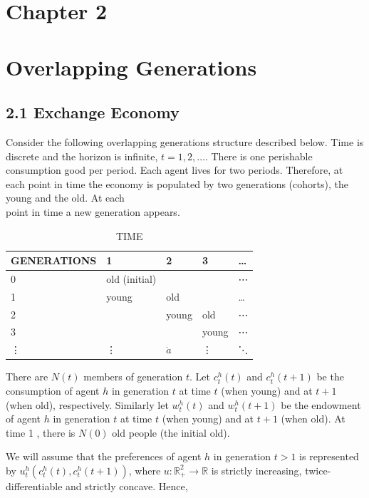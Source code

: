 \documentclass[10pt]{article}
\begin{document}
\captionsetup{singlelinecheck=false}
\section*{Chapter 2}
\section*{Overlapping Generations}
\subsection*{2.1 Exchange Economy}
Consider the following overlapping generations structure described below. Time is discrete and the horizon is infinite, $t=1,2, \ldots$. There is one perishable consumption good per period. Each agent lives for two periods. Therefore, at each point in time the economy is populated by two generations (cohorts), the young and the old. At each\\
point in time a new generation appears.

\begin{table}[h]
\begin{center}
\captionsetup{labelformat=empty}
\caption{TIME}
\begin{tabular}{|l|l|l|l|l|}
\hline
GENERATIONS & 1 & 2 & 3 & … \\
\hline
0 & old (initial) &  &  & ⋯ \\
\hline
1 & young & old &  & … \\
\hline
2 &  & young & old & ⋯ \\
\hline
3 &  &  & young & ⋯ \\
\hline
⋮ & ⋮ & $\dot{a}$ & ⋮ & ⋱ \\
\hline
\end{tabular}
\end{center}
\end{table}

There are $N(t)$ members of generation $t$. Let $c_{t}^{h}(t)$ and $c_{t}^{h}(t+1)$ be the consumption of agent $h$ in generation $t$ at time $t$ (when young) and at $t+1$ (when old), respectively. Similarly let $w_{t}^{h}(t)$ and $w_{t}^{h}(t+1)$ be the endowment of agent $h$ in generation $t$ at time $t$ (when young) and at $t+1$ (when old). At time 1 , there is $N(0)$ old people (the initial old).

We will assume that the preferences of agent $h$ in generation $t>1$ is represented by $u_{t}^{h}\left(c_{t}^{h}(t), c_{t}^{h}(t+1)\right)$, where $u: \mathbb{R}_{+}^{2} \rightarrow \mathbb{R}$ is strictly increasing, twice-differentiable and strictly concave. Hence,
\end{document}
